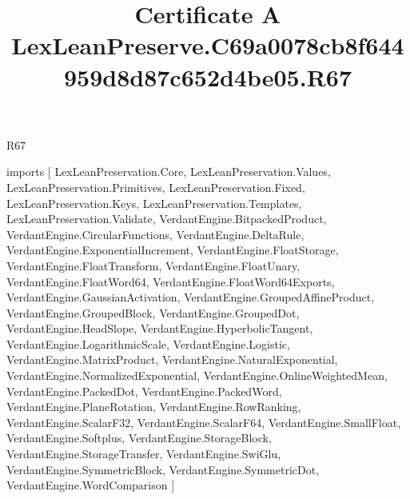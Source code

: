 \begin{lexlean}{R67}
\title{Certificate A LexLeanPreserve.C69a0078cb8f644959d8d87c652d4be05.R67}
\begin{coremodule}
imports [
  LexLeanPreservation.Core,
  LexLeanPreservation.Values,
  LexLeanPreservation.Primitives,
  LexLeanPreservation.Fixed,
  LexLeanPreservation.Keys,
  LexLeanPreservation.Templates,
  LexLeanPreservation.Validate,
  VerdantEngine.BitpackedProduct,
  VerdantEngine.CircularFunctions,
  VerdantEngine.DeltaRule,
  VerdantEngine.ExponentialIncrement,
  VerdantEngine.FloatStorage,
  VerdantEngine.FloatTransform,
  VerdantEngine.FloatUnary,
  VerdantEngine.FloatWord64,
  VerdantEngine.FloatWord64Exports,
  VerdantEngine.GaussianActivation,
  VerdantEngine.GroupedAffineProduct,
  VerdantEngine.GroupedBlock,
  VerdantEngine.GroupedDot,
  VerdantEngine.HeadSlope,
  VerdantEngine.HyperbolicTangent,
  VerdantEngine.LogarithmicScale,
  VerdantEngine.Logistic,
  VerdantEngine.MatrixProduct,
  VerdantEngine.NaturalExponential,
  VerdantEngine.NormalizedExponential,
  VerdantEngine.OnlineWeightedMean,
  VerdantEngine.PackedDot,
  VerdantEngine.PackedWord,
  VerdantEngine.PlaneRotation,
  VerdantEngine.RowRanking,
  VerdantEngine.ScalarF32,
  VerdantEngine.ScalarF64,
  VerdantEngine.SmallFloat,
  VerdantEngine.Softplus,
  VerdantEngine.StorageBlock,
  VerdantEngine.StorageTransfer,
  VerdantEngine.SwiGlu,
  VerdantEngine.SymmetricBlock,
  VerdantEngine.SymmetricDot,
  VerdantEngine.WordComparison
]


\end{coremodule}
\end{lexlean}
